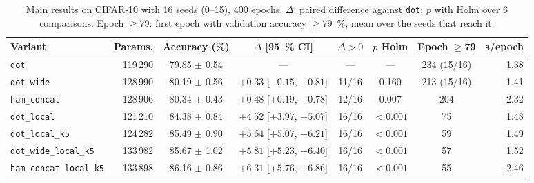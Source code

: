 
\begin{table}[!t]
\centering
\footnotesize
\caption{Main results on CIFAR-10 with 16 seeds (0--15), 400 epochs. $\Delta$: paired difference against \texttt{dot}; $p$ with Holm over 6 comparisons. Epoch $\geq$79: first epoch with validation accuracy $\geq$79~\%, mean over the seeds that reach it.}
\label{tab:principal}
\begin{adjustbox}{max width=\linewidth}
\begin{tabular}{lrcccccr}
\toprule
Variant & Params. & Accuracy (\%) & $\Delta$ [95~\% CI] & $\Delta>0$ & $p$ Holm & Epoch $\geq$79 & s/epoch \\
\midrule
\texttt{dot} & 119\,290 & 79.85 $\pm$ 0.54 & --- & --- & --- & 234 (15/16) & 1.38 \\
\texttt{dot\_wide} & 128\,990 & 80.19 $\pm$ 0.56 & $+0.33$ [$-0.15$, $+0.81$] & 11/16 & 0.160 & 213 (15/16) & 1.41 \\
\texttt{ham\_concat} & 128\,906 & 80.34 $\pm$ 0.43 & $+0.48$ [$+0.19$, $+0.78$] & 12/16 & 0.007 & 204 & 2.32 \\
\texttt{dot\_local} & 121\,210 & 84.38 $\pm$ 0.84 & $+4.52$ [$+3.97$, $+5.07$] & 16/16 & $<0.001$ & 75 & 1.48 \\
\texttt{dot\_local\_k5} & 124\,282 & 85.49 $\pm$ 0.90 & $+5.64$ [$+5.07$, $+6.21$] & 16/16 & $<0.001$ & 59 & 1.49 \\
\texttt{dot\_wide\_local\_k5} & 133\,982 & 85.67 $\pm$ 1.02 & $+5.81$ [$+5.23$, $+6.40$] & 16/16 & $<0.001$ & 57 & 1.52 \\
\texttt{ham\_concat\_local\_k5} & 133\,898 & 86.16 $\pm$ 0.86 & $+6.31$ [$+5.76$, $+6.86$] & 16/16 & $<0.001$ & 55 & 2.46 \\
\bottomrule
\end{tabular}
\end{adjustbox}
\end{table}
